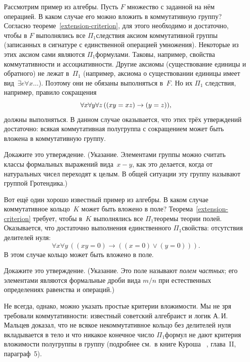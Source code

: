 Рассмотрим пример из алгебры. Пусть $F$ \т множество с заданной
на нём операцией. В каком случае его можно вложить в
коммутативную группу? Согласно
теореме~\ref{extension-criterion}, для этого необходимо и
достаточно, чтобы в $F$ выполнялись все $\Pi_1$\д следствия
аксиом коммутативной группы (записанных в сигнатуре с
единственной операцией умножения). Некоторые из этих аксиом сами
являются $\Pi_1$\д формулами. Таковы, например, свойства
коммутативности и ассоциативности. Другие аксиомы (существование
единицы и обратного) не лежат в~$\Pi_1$ (например, аксиома о
существовании единицы имеет вид~$\exists e \forall x\dots$).
Поэтому они не обязаны выполняться в~$F$. Но их $\Pi_1$\д
следствия, например, правило сокращения
        $$
\forall x\forall y\forall z\, ({(xy=xz)}\hm\to{(y=z)}),
        $$
должны выполняться. В данном случае оказывается, что этих трёх
утверждений достаточно: всякая коммутативная полугруппа с
сокращением может быть вложена в коммутативную группу.

\begin{problem}
Докажите это утверждение. (Указание. Элементами группы можно
считать классы формальных выражений вида~$x-y$, как это
делается, когда от натуральных чисел переходят к целым. В общей
ситуации эту группу называют группой Гротендика.)
\end{problem}

Вот ещё один хорошо известный пример из алгебры. В каком случае
коммутативное кольцо~$K$ может быть вложено в поле?
Теорема~\ref{extension-criterion} требует, чтобы в~$K$
выполнялись все $\Pi_1$\д теоремы теории полей. Оказывается, что
достаточно выполнения единственного $\Pi_1$\д свойства:
отсутствия делителей нуля:
        $$
\forall x \forall y \, ((xy=0)\to ((x=0)\lor (y=0))).
        $$
В этом случае кольцо может быть вложено в поле.

\begin{problem}
Докажите это утверждение. (Указание. Это поле называют
\emph{полем частных};%
его элементами являются формальные дроби
вида $m/n$ при естественных определениях равенства и операций.)
\end{problem}

Не всегда, однако, можно указать простые критерии вложимости. Мы
не зря требовали коммутативности: известный советский алгебраист
и логик А.\,И.\,Мальцев%
доказал, что не всякое некоммутативное
кольцо без делителей нуля вкладывается в тело и что никакое
конечное число $\Pi_1$\д формул не дают критерия вложимости
полугруппы в группу (подробнее см.~в книге Куроша%
%
~\cite{kurosh},
глава~II, параграф~5).

